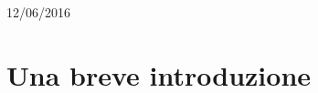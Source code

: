 \documentclass[12pt]{article}
\begin{document}
\begin{titlepage}


{\large 12/06/2016}\\[3cm] %


 

\vfill %

\end{titlepage}
\newpage
\renewcommand{\contentsname}{Indice}
\tableofcontents

\newpage
{}

\section{Una breve introduzione}
\end{document}
